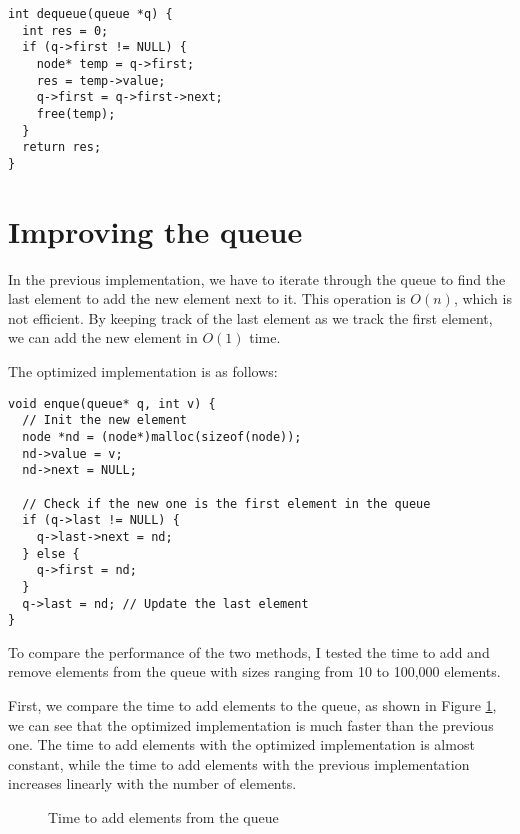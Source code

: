 \documentclass[a4paper,11pt]{article}
\begin{document}
\begin{verbatim}
int dequeue(queue *q) {
  int res = 0;
  if (q->first != NULL) {
    node* temp = q->first;
    res = temp->value;
    q->first = q->first->next;
    free(temp);  
  }
  return res;
}
\end{verbatim}

\section*{Improving the queue}

In the previous implementation, we have to iterate through the queue to find the 
last element to add the new element next to it. This operation is $O(n)$, which is
not efficient. By keeping track of the last element as we track the first element,
we can add the new element in $O(1)$ time.

The optimized implementation is as follows:

\begin{verbatim}
void enque(queue* q, int v) {
  // Init the new element
  node *nd = (node*)malloc(sizeof(node));
  nd->value = v;
  nd->next = NULL;

  // Check if the new one is the first element in the queue
  if (q->last != NULL) {
    q->last->next = nd;
  } else {
    q->first = nd;
  }
  q->last = nd; // Update the last element
}
\end{verbatim}

To compare the performance of the two methods, I tested the time to add and remove
elements from the queue with sizes ranging from 10 to 100,000 elements.

First, we compare the time to add elements to the queue, as shown in Figure \ref{fig:queue_add},
we can see that the optimized implementation is much faster than the previous one.
The time to add elements with the optimized implementation is almost constant, while
the time to add elements with the previous implementation increases linearly with the
number of elements.

\begin{figure}[H]
  \centering
  \caption{Time to add elements from the queue}
  \label{fig:queue_add}
\end{figure}
\end{document}
